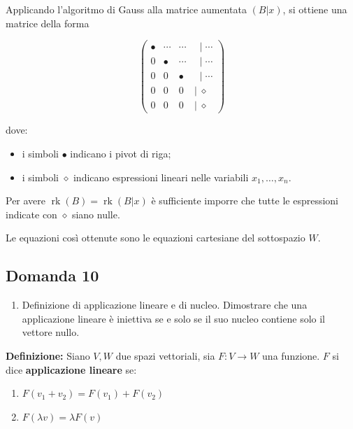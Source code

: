 \documentclass[
  a4paper,
]{article}
\providecommand{\tightlist}{%
  \setlength{\itemsep}{0pt}\setlength{\parskip}{0pt}}
\providecommand{\tightlist}{}
\begin{document}
Applicando l'algoritmo di Gauss alla matrice aumentata \((B|x)\), si
ottiene una matrice della forma

\[
\begin{pmatrix}
\bullet & \cdots & \cdots & \;\;|\;\cdots \\
0 & \bullet & \cdots & \;\;|\;\cdots \\
0 & 0 & \bullet & \;\;|\;\cdots \\
0 & 0 & 0 & |\;\diamond \\
0 & 0 & 0 & |\;\diamond
\end{pmatrix}
\]

dove:

\begin{itemize}
\tightlist
\item
  i simboli \(\bullet\) indicano i pivot di riga;
\item
  i simboli \(\diamond\) indicano espressioni lineari nelle variabili
  \(x_1,\dots,x_n\).
\end{itemize}

Per avere \(\operatorname{rk}(B)=\operatorname{rk}(B|x)\) è sufficiente
imporre che tutte le espressioni indicate con \(\diamond\) siano nulle.

Le equazioni così ottenute sono le equazioni cartesiane del sottospazio
\(W\).

\hypertarget{domanda-10}{%
\subsection{Domanda 10}\label{domanda-10}}

\begin{observationbox}[Domanda]
\begin{enumerate}
\def\labelenumi{\arabic{enumi}.}
\setcounter{enumi}{9}
\tightlist
\item
  Definizione di applicazione lineare e di nucleo. Dimostrare che una
  applicazione lineare è iniettiva se e solo se il suo nucleo contiene
  solo il vettore nullo.
\end{enumerate}
\end{observationbox}

\textbf{Definizione:} Siano \(V, W\) due spazi vettoriali, sia
\(F: V \to W\) una funzione. \(F\) si dice \textbf{applicazione lineare}
se:

\begin{enumerate}
\def\labelenumi{\arabic{enumi}.}
\tightlist
\item
  \(F(v_1 + v_2) = F(v_1) + F(v_2)\)
\item
  \(F(\lambda v) = \lambda F(v)\)
\end{enumerate}
\end{document}
